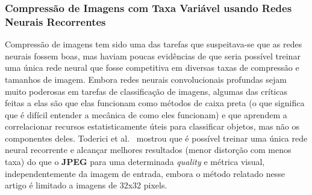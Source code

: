 \subsubsection{Compressão de Imagens com Taxa Variável usando Redes Neurais Recorrentes}
\label{variablerate}
Compressão de imagens tem sido uma das tarefas que suspeitava-se que as redes neurais fossem boas, mas haviam poucas evidências de que seria possível treinar uma única rede neural que fosse competitiva em diversas taxas de compressão e tamanhos de imagem. Embora redes neurais convolucionais profundas sejam muito poderosas em tarefas de classificação de imagens, algumas das críticas feitas a elas são que elas funcionam como métodos de caixa preta (o que significa que é difícil entender a mecânica de como eles funcionam) e que aprendem a correlacionar recursos estatisticamente úteis para classificar objetos, mas não os componentes deles. Toderici et al.~\cite{toderici2016} mostrou que é possível treinar uma única rede neural recorrente e alcançar
melhores resultados (menor distorção com menos taxa) do que o \textbf{JPEG} para uma determinada \textit{quality} e métrica visual, independentemente da imagem de entrada, embora o método relatado nesse artigo é limitado a imagens de 32x32 pixels.

